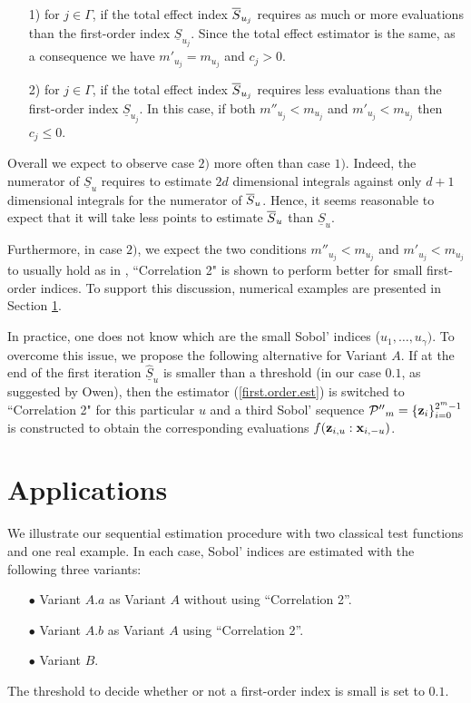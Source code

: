 \begin{itemize}
\item[1)] for $j \in \Gamma$, if the total effect index $\ov{$S$}_{u_j}$ requires as much or more evaluations than the first-order index $\underline{S}_{u_j}$. Since the total effect estimator is the same, as a consequence we have $m'_{u_j}=m_{u_j}$ and $c_j >0$.
\item[2)] for $j \in \Gamma$, if the total effect index $\ov{$S$}_{u_j}$ requires less evaluations than the first-order index $\underline{S}_{u_j}$. In this case, if both $m''_{u_j} < m_{u_j}$ and $m'_{u_j} < m_{u_j}$ then $c_j \leq 0$.  
\end{itemize}
Overall we expect to observe case $2)$ more often than case $1)$. Indeed, the numerator of $\underline{S}_u$ requires to estimate $2d$ dimensional integrals against only $d+1$ dimensional integrals for the numerator of $\ov{$S$}_u$. Hence, it seems reasonable to expect that it will take less points to estimate $\ov{$S$}_u$ than $\underline{S}_u$. 

Furthermore, in case $2)$, we expect the two conditions $m''_{u_j} < m_{u_j}$ and $m'_{u_j} < m_{u_j}$ to usually hold as in \cite{Owen}, ``Correlation 2" is shown to perform better for small first-order indices. To support this discussion, numerical examples are presented in Section \ref{sec:5}. 

In practice, one does not know which are the small Sobol' indices ($u_1,\dots,u_\gamma)$. To overcome this issue, we propose the following alternative for Variant $A$. If at the end of the first iteration $\widehat{\underline{S}}_u$ is smaller than a threshold (in our case $0.1$, as suggested by Owen), then the estimator (\ref{first.order.est}) is switched to ``Correlation 2" for this particular $u$ and a third Sobol' sequence $\mathcal{P''}_{m}=\{\boldsymbol{\mathbf{z}}_i\}_{i=0}^{2^m-1}$ is constructed to obtain the corresponding evaluations $f({\boldsymbol{\mathbf{z}}}_{i,u}:{\boldsymbol{\mathbf{x}}}_{i,-u})$.

\section{Applications}
\label{sec:5}

We illustrate our sequential estimation procedure with two classical test functions and one real example. In each case, Sobol' indices are estimated with the following three variants:
\begin{itemize}
\item[$\bullet$] Variant $A.a$ as Variant $A$ without using ``Correlation 2''. 
\item[$\bullet$] Variant $A.b$ as Variant $A$ using ``Correlation 2''.
\item[$\bullet$] Variant $B$.
\end{itemize}
The threshold to decide whether or not a first-order index is small is set to $0.1$. 

